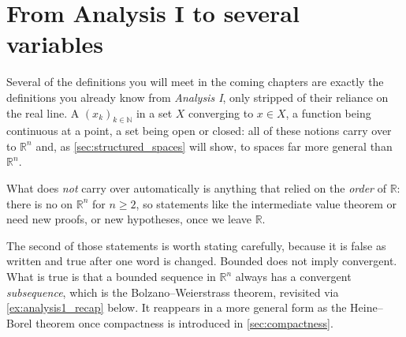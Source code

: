 \section{From Analysis I to several variables}
\label{sec:analysis1_recap}

Several of the definitions you will meet in the coming chapters are exactly the definitions you
already know from \emph{Analysis I}, only stripped of their reliance on the real line. A
  $(x_k)_{k \in \mathbb{N}}$ in a set $X$ converging to
$x \in X$, a function being continuous at a point, a set being open or closed: all of these
notions carry over to $\mathbb{R}^n$ and, as \cref{sec:structured_spaces} will show, to spaces far
more general than $\mathbb{R}^n$.

What does \emph{not} carry over automatically is anything
that relied on the \emph{order} of $\mathbb{R}$: there is no \qt{$\leq$} on $\mathbb{R}^n$ for
$n \geq 2$, so statements like the intermediate value theorem or  need new proofs, or new hypotheses, once we leave $\mathbb{R}$.

\begin{remark}
The second of those statements is worth stating carefully, because it is false as written and true
after one word is changed. Bounded does not imply convergent. What is true is that a bounded
sequence in $\mathbb{R}^n$ always has a convergent \emph{subsequence}, which is the
Bolzano--Weierstrass theorem, revisited via \cref{ex:analysis1_recap} below. It reappears in a more general
form as the Heine--Borel theorem once compactness is introduced in \cref{sec:compactness}.
\end{remark}


